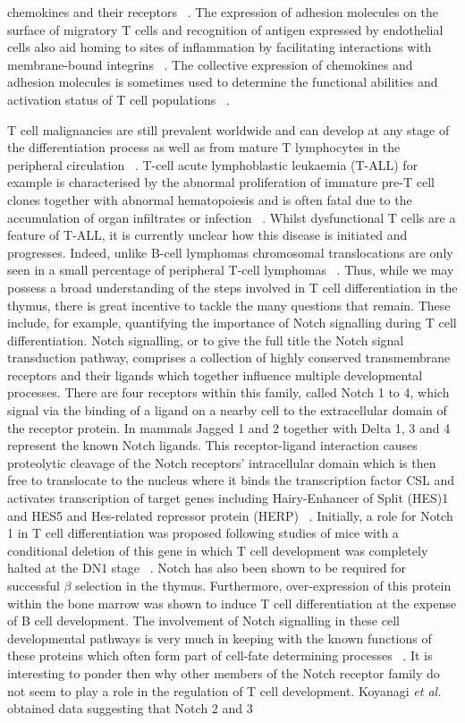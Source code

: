 chemokines and their receptors ~\autocite{Gri2014}. The expression of adhesion molecules on the surface of migratory T cells and recognition of antigen expressed by endothelial cells also aid homing to sites of inflammation by facilitating interactions with membrane-bound integrins ~\autocite{Fu2013}. The collective expression of chemokines and adhesion molecules is sometimes used to determine the functional abilities and activation status of T cell populations ~\autocite{Won2016}. 

T cell malignancies are still prevalent worldwide and can develop at any stage of the differentiation process as well as from mature T lymphocytes in the peripheral circulation ~\autocite{Fil2002}. T-cell acute lymphoblastic leukaemia (T-ALL) for example is characterised by the abnormal proliferation of immature pre-T cell clones together with abnormal hematopoiesis and is often fatal due to the accumulation of organ infiltrates or infection ~\autocite{Tia2013}. Whilst dysfunctional T cells are a feature of T-ALL, it is currently unclear how this disease is initiated and progresses. Indeed, unlike B-cell lymphomas chromosomal translocations are only seen in a small percentage of peripheral T-cell lymphomas ~\autocite{Fil2002}. Thus, while we may possess a broad understanding of the steps involved in T cell differentiation in the thymus, there is great incentive to tackle the many questions that remain. These include, for example, quantifying the importance of Notch signalling during T cell differentiation. Notch signalling, or to give the full title the Notch signal transduction pathway, comprises a collection of highly conserved transmembrane receptors and their ligands which together influence multiple developmental processes. There are four receptors within this family, called Notch 1 to 4, which signal via the binding of a ligand on a nearby cell to the extracellular domain of the receptor protein. In mammals Jagged 1 and 2 together with Delta 1, 3 and 4 represent the known Notch ligands. This receptor-ligand interaction causes proteolytic cleavage of the Notch receptors' intracellular domain which is then free to translocate to the nucleus where it binds the transcription factor CSL and activates transcription of target genes including Hairy-Enhancer of Split (HES)1 and HES5 and Hes-related repressor protein (HERP) ~\autocite{Wee2006}. Initially, a role for Notch 1 in T cell differentiation was proposed following studies of mice with a conditional deletion of this gene in which T cell development was completely halted at the DN1 stage ~\autocite{Wee2006,Koya2012}. Notch has also been shown to be required for successful $\beta$ selection in the thymus. Furthermore, over-expression of this protein within the bone marrow was shown to induce T cell differentiation at the expense of B cell development. The involvement of Notch signalling in these cell developmental pathways is very much in keeping with the known functions of these proteins which often form part of cell-fate determining processes ~\autocite{Koya2012}. It is interesting to ponder then why other members of the Notch receptor family do not seem to play a role in the regulation of T cell development. Koyanagi \textit{et al.} obtained data suggesting that Notch 2 and 3 